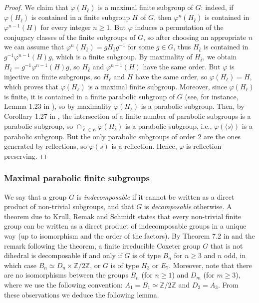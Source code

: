 \documentclass[a4paper, 11pt]{amsart}
\theoremstyle{definition}
\theoremstyle{remark}
\renewcommand{\geq}{\geqslant}
\begin{document}
\begin{proof}
\smallskip \noindent We claim that $\varphi(H_{\bar{\ell}})$ is a maximal finite subgroup of $G$: indeed, if $\varphi(H_{\bar{\ell}})$ is contained in a finite subgroup $H$ of $G$, then $\varphi^n(H_{\bar{\ell}})$ is contained in $\varphi^{n-1}(H)$ for every integer $n\geq 1$. But $\varphi$ induces a permutation of the conjugacy classes of the finite subgroups of $G$, so after choosing an appropriate $n$ we can assume that $\varphi^n(H_{\bar{\ell}})=gH_{\bar{\ell}}g^{-1}$ for some $g\in G$, thus $H_{\bar{\ell}}$ is contained in $g^{-1}\varphi^{n-1}(H)g$, which is a finite subgroup. By maximality of $H_{\bar{\ell}}$, we obtain $H_{\bar{\ell}}=g^{-1}\varphi^{n-1}(H)g$, so $H_{\bar{\ell}}$ and $\varphi^{n-1}(H)$ have the same order. But $\varphi$ is injective on finite subgroups, so $H_{\bar{\ell}}$ and $H$ have the same order, so $\varphi(H_{\bar{\ell}})=H$, which proves that $\varphi(H_{\bar{\ell}})$ is a maximal finite subgroup. Moreover, since $\varphi(H_{\bar{\ell}})$ is finite, it is contained in a finite parabolic subgroup of $G$ (see, for instance, Lemma 1.23 in \cite{franz}), so by maximality $\varphi(H_{\bar{\ell}})$ is a parabolic subgroup. Then, by Corollary 1.27 in \cite{franz}, the intersection of a finite number of parabolic subgroups is a parabolic subgroup, so $\cap_{\bar{\ell}\in E}\varphi(H_{\bar{\ell}})$ is a parabolic subgroup, i.e., $\varphi(\langle s\rangle)$ is a parabolic subgroup. But the only parabolic subgroups of order 2 are the ones generated by reflections, so $\varphi(s)$ is a reflection. Hence, $\varphi$ is reflection-preserving.\end{proof}

\subsubsection{Maximal parabolic finite subgroups}\label{list}

We say that a group $G$ is \emph{indecomposable} if it cannot be written as a direct product of non-trivial subgroups, and that $G$ is \emph{decomposable} otherwise. A theorem due to Krull, Remak and Schmidt states that every non-trivial finite group can be written as a direct product of indecomposable groups in a unique way (up to isomorphism and the order of the factors). By Theorem 7.2 in \cite{Paris} and the remark following the theorem, a finite irreducible Coxeter group $G$ that is not dihedral is decomposable if and only if $G$ is of type $B_n$ for $n\geq 3$ and $n$ odd, in which case $B_n\simeq D_n\times \mathbb{Z}/2\mathbb{Z}$, or $G$ is of type $H_3$ or $E_7$. Moreover, note that there are no isomorphisms between the groups $B_n$ (for $n\geq 1$) and $D_m$ (for $m\geq 3$), where we use the following convention: $A_1=B_1\simeq \mathbb{Z}/2\mathbb{Z}$ and $D_3=A_3$. From these observations we deduce the following lemma.
\end{document}
